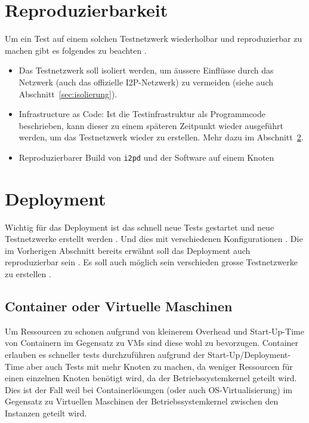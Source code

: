 

\section{Reproduzierbarkeit}

Um ein Test auf einem solchen Testnetzwerk wiederholbar und reproduzierbar zu machen gibt es folgendes zu beachten .

\begin{itemize}
    \item Das Testnetzwerk soll isoliert werden, um äussere Einflüsse durch das Netzwerk (auch das offizielle I2P-Netzwerk) zu vermeiden (siehe auch Abschnitt~\ref{sec:isolierung}).
    \item Infrastructure as Code: Ist die Testinfrastruktur als Programmcode beschrieben, kann dieser zu einem späteren Zeitpunkt wieder ausgeführt werden, um das Testnetzwerk wieder zu erstellen. Mehr dazu im Abschnitt~\ref{sec:deployment}.
    \item Reproduzierbarer Build von \lstinline|i2pd| und der Software auf einem Knoten
\end{itemize}


\section{Deployment}\label{sec:deployment}

Wichtig für das Deployment ist das schnell neue Tests gestartet und neue Testnetzwerke erstellt werden .
Und dies mit verschiedenen Konfigurationen .
Die im Vorherigen Abschnitt bereits erwähnt soll das Deployment auch reproduzierbar sein .
Es soll auch möglich sein verschieden grosse Testnetzwerke zu erstellen .


\subsection{Container oder Virtuelle Maschinen}

Um Ressourcen zu schonen aufgrund von kleinerem Overhead und Start-Up-Time von Containern im Gegensatz zu VMs sind diese wohl zu bevorzugen.
Container erlauben es schneller tests durchzuführen  aufgrund der Start-Up/Deployment-Time
aber auch Tests mit mehr Knoten zu machen, da weniger Ressourcen für einen einzelnen Knoten benötigt wird, da der Betriebssystemkernel geteilt wird.
Dies ist der Fall weil bei Containerlösungen (oder auch OS-Virtualisierung) im Gegensatz zu Virtuellen Maschinen der Betriebssystemkernel zwischen den Instanzen geteilt wird.

